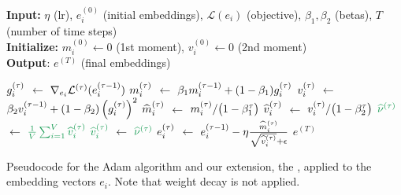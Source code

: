 \begin{algorithm}[t]
    \small
    \textbf{Input:}
    $\eta$ (lr), $e_i^{(0)}$ (initial embeddings),
    $\mathcal{L}(e_i)$ (objective), $\beta_1, \beta_2$ (betas), $T$ (number of time steps)
    \\
    \textbf{Initialize:}
    $m_i^{(0)} \leftarrow 0$ (1st moment),
    $v_i^{(0)} \leftarrow 0$ (2nd moment)
    \\
    \textbf{Output}: $e^{(T)}$ (final embeddings)
    \begin{algorithmic}[1]
                \State $g_i^{(\tau)}$ $\gets$ $\nabla_{e_i} \mathcal{L}^{(\tau)} (e_i^{(\tau-1)})$
                \State $m_i^{(\tau)}$ $\gets$ $\beta_1 m_i^{(\tau-1)} + (1 - \beta_1) g_i^{(\tau)}$%
                \label{alg:line:adam_first_moment_definition}
                \State $v_i^{(\tau)}$ $\gets$ $\beta_2 v_i^{(\tau-1)} + (1-\beta_2) \left(g_i^{(\tau)}\right)^2$%
                \label{alg:line:adam_second_moment_definition}
                \State $\widehat{m}_i^{(\tau)}$ $\gets$ $m_i^{(\tau)}/\big(1-\beta_1^\tau \big)$%
                \label{alg:line:adam_first_moment_exp_averages}
                \State $\widehat{v}_i^{(\tau)}$ $\gets$ $v_i^{(\tau)}/\big(1-\beta_2^\tau \big)$%
              \label{alg:line:adam_second_moment_exp_averages}
            \EndFor
            \BeginBox[fill=\colhighlight!10!White, xshift=0.6em, inner xsep=-0.7em]
                \State $\highlight{\secondmomentavg}$ $\gets$ $\highlight{\frac{1}{V} \sum_{i=1}^V \secondmoment}$ %
                \label{alg:line:coupled_adam_second_moment}%
            \EndIf
                    \State $\highlight{\secondmoment}$ $\gets$ $\highlight{\secondmomentavg}$%
                    \label{alg:line:coupled_adam_second_moment_2}
                \EndIf
            \EndBox
                \State $e_i^{(\tau)}$ $\gets$ $e_i^{(\tau-1)} - \eta \frac{\widehat{m}_i^{(\tau)}}{\sqrt{\widehat{v}_i^{(\tau)}} + \epsilon}$%
                \label{alg:line:adam_update}
            \EndFor
        \EndFor
        \State \Return $e^{(T)}$
    \end{algorithmic}
    \caption{Pseudocode for the Adam algorithm and our extension, the , applied to the embedding vectors $e_i$. Note that weight decay is not applied.}
    \label{alg:algorithm_adam}
\end{algorithm}
